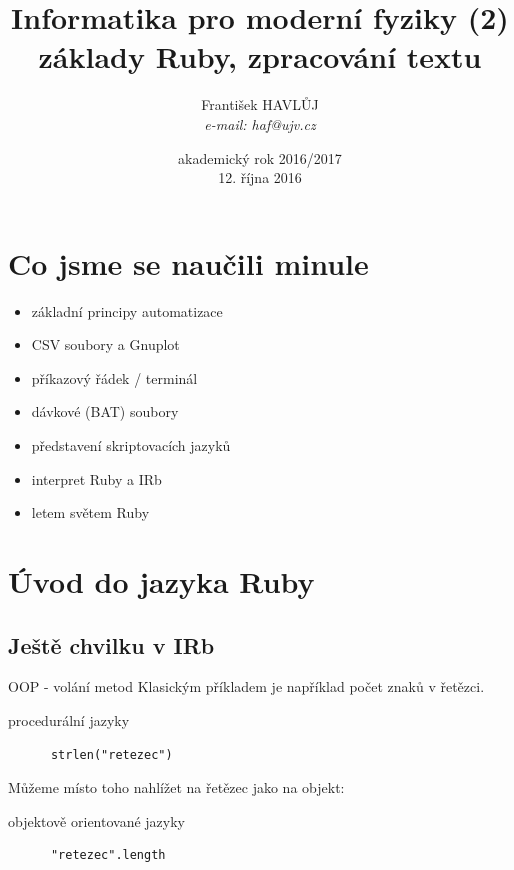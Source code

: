 \documentclass{beamer}
\title[IMF (2)]{Informatika pro moderní fyziky (2)\\základy Ruby, zpracování textu}
\author[Franti\v{s}ek HAVL\r{U}J, ORF ÚJV Řež]{Franti\v{s}ek HAVL\r{U}J\\{\scriptsize \emph{e-mail: haf@ujv.cz}}}
\date{akademický rok 2016/2017\\12. října 2016}
\institute[ORF ÚJV Řež]
{ÚJV Řež\\oddělení Reaktorové fyziky a podpory palivového cyklu}
\begin{document}
\begin{frame}
  \titlepage
\end{frame}

\begin{frame}
  \tableofcontents
\end{frame}

\section{Co jsme se naučili minule}

\begin{frame}{}
  \begin{itemize}
    \item základní principy automatizace
    \item CSV soubory a Gnuplot
    \item příkazový řádek / terminál
    \item dávkové (BAT) soubory
    \item představení skriptovacích jazyků
    \item interpret Ruby a IRb
    \item letem světem Ruby
  \end{itemize}
\end{frame}


\section{Úvod do jazyka Ruby}

\subsection{Ještě chvilku v IRb}

\begin{frame}[fragile]{OOP - volání metod}
  Klasickým příkladem je například počet znaků v řetězci.
  \begin{block}{procedurální jazyky}
    \begin{verbatim}
      strlen("retezec")
    \end{verbatim}
  \end{block}
  \pause
  Můžeme místo toho nahlížet na řetězec jako na objekt:
  \pause
  \begin{block}{objektově orientované jazyky}
    \begin{verbatim}
      "retezec".length
    \end{verbatim}
  \end{block}
\end{frame}
\end{document}
